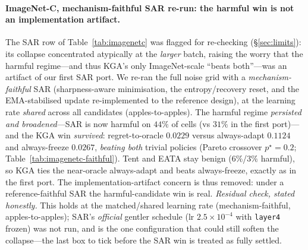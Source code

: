 \documentclass[conference]{IEEEtran}
\theoremstyle{plain}
\theoremstyle{definition}
\begin{document}
\paragraph{ImageNet-C, mechanism-faithful SAR re-run: the harmful win is not an implementation artifact.}
The SAR row of Table~\ref{tab:imagenetc} was flagged for re-checking (\S\ref{sec:limits}): its
collapse concentrated atypically at the \emph{larger} batch, raising the worry that the harmful
regime---and thus \textsc{KGA}'s only ImageNet-scale ``beats both''---was an artifact of our first
SAR port. We re-ran the full noise grid with a \emph{mechanism-faithful} SAR (sharpness-aware
minimisation, the entropy/recovery reset, and the EMA-stabilised update re-implemented to the
reference design), at the learning rate \emph{shared} across all candidates (apples-to-apples).
The harmful regime \emph{persisted and broadened}---SAR is now harmful on $44\%$ of cells (vs
$31\%$ in the first port)---and the \textsc{KGA} win \emph{survived}: regret-to-oracle $0.0229$
versus always-adapt $0.1124$ and always-freeze $0.0267$, \emph{beating both} trivial policies
(Pareto crossover $p^\star{=}0.2$; Table~\ref{tab:imagenetc-faithful}). Tent and EATA stay benign
($6\%$/$3\%$ harmful), so \textsc{KGA} ties the near-oracle always-adapt and beats always-freeze,
exactly as in the first port. The implementation-artifact concern is thus removed: under a
reference-faithful SAR the harmful-candidate win is real. \emph{Residual check, stated honestly.}
This holds at the matched/shared learning rate (mechanism-faithful, apples-to-apples); SAR's
\emph{official} gentler schedule (lr $2.5{\times}10^{-4}$ with \texttt{layer4} frozen) was not run,
and is the one configuration that could still soften the collapse---the last box to tick before the
SAR win is treated as fully settled.
\end{document}
